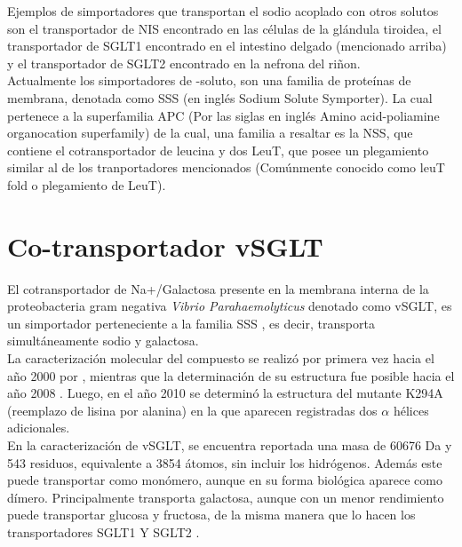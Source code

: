 Ejemplos de simportadores que transportan el sodio acoplado con otros solutos son el transportador de  NIS encontrado en las c\'{e}lulas de la gl\'{a}ndula tiroidea, el transportador de   SGLT1 encontrado en el intestino delgado (mencionado arriba) y el transportador de   SGLT2 encontrado en la nefrona del ri\~{n}on.\\ 

Actualmente los simportadores de -soluto, son una familia de prote\'{i}nas de membrana, denotada como SSS (en ingl\'{e}s Sodium Solute Symporter). La cual pertenece a la superfamilia APC (Por las siglas en ingl\'{e}s Amino acid-poliamine organocation superfamily) de la cual, una familia a resaltar es la NSS, que contiene el cotransportador de leucina y dos  LeuT, que posee un plegamiento similar al de los tranportadores mencionados (Com\'{u}nmente conocido como leuT fold o plegamiento de LeuT).\\
\section{Co-transportador vSGLT}\label{sec:esvSGLT}
El cotransportador de Na+/Galactosa presente en la membrana interna de la proteobacteria gram negativa \textit{Vibrio Parahaemolyticus} denotado como vSGLT, es un simportador perteneciente a la familia  SSS \cite{SaierJr.}, es decir, transporta simult\'{a}neamente sodio y galactosa.\\

La caracterizaci\'{o}n molecular del compuesto se realiz\'{o} por primera vez hacia el a\~{n}o 2000 por \cite{Turk2000}, mientras que la determinaci\'{o}n de su estructura fue posible hacia el a\~{n}o 2008 \cite{Faham2008}. Luego, en el a\~{n}o 2010 se determin\'{o} la estructura del mutante K294A (reemplazo de lisina por alanina) en la que aparecen registradas dos $\alpha$ h\'{e}lices adicionales.\\

En la caracterizaci\'{o}n de vSGLT, se encuentra reportada una  masa de 60676 Da y 543 residuos, equivalente a 3854 \'{a}tomos, sin incluir los hidr\'{o}genos. Adem\'{a}s este puede transportar como mon\'{o}mero,  aunque en su forma biol\'{o}gica aparece como d\'{i}mero. Principalmente transporta galactosa, aunque con un menor rendimiento puede transportar glucosa y fructosa, de la misma manera que lo hacen los transportadores SGLT1 Y SGLT2 \cite{SaierJr.}.\\

